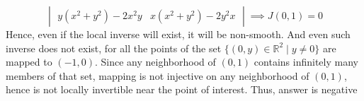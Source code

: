 \documentclass[8pt]{article} %
\begin{document}
\begin{enumerate}
{\[\begin{vmatrix}
			y(x^2+y^2)-2x^2y&x(x^2+y^2)-2y^2x\end{vmatrix}\implies J(0,1)=0\]
			Hence, even if the local inverse will exist, it will be non-smooth. And even such inverse does not exist, for all the points
			of the set $\{(0,y)\in\mathbb{R}^2\mid y\neq 0\}$ are mapped to $(-1,0)$. Since any neighborhood of $(0,1)$ contains infinitely many members of
			that set, mapping is not injective on any neighborhood of $(0,1)$, hence is not locally invertible near the point of interest. Thus, answer is negative
			}
\end{enumerate}
\end{document}
